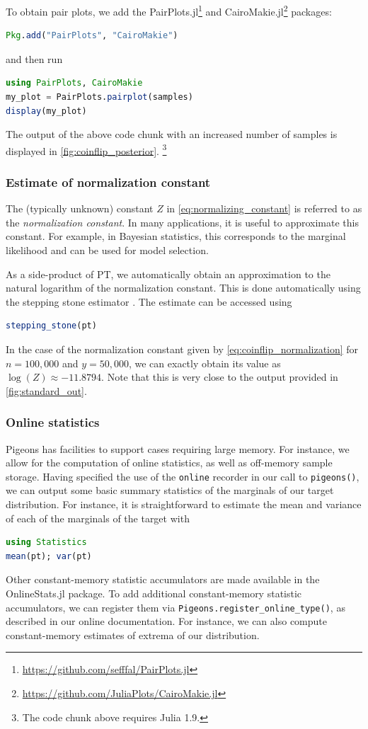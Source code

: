  
To obtain pair plots, we add the 
PairPlots.jl\footnote{\url{https://github.com/sefffal/PairPlots.jl}}
and CairoMakie.jl\footnote{\url{https://github.com/JuliaPlots/CairoMakie.jl}}
packages:
\begin{lstlisting}[language=Julia]
Pkg.add("PairPlots", "CairoMakie")
\end{lstlisting}
and then run
\begin{lstlisting}[language=Julia]
using PairPlots, CairoMakie
my_plot = PairPlots.pairplot(samples) 
display(my_plot)
\end{lstlisting}
The output of the above code chunk with an increased number of samples 
is displayed in \cref{fig:coinflip_posterior}.
\footnote{The code chunk above requires Julia 1.9.}


\subsubsection{Estimate of normalization constant}
The (typically unknown) constant $Z$ in \cref{eq:normalizing_constant} is 
referred to as the \emph{normalization constant}. 
In many applications, it is useful to approximate this constant. 
For example, in Bayesian statistics, this corresponds to the 
marginal likelihood and can be used for model selection. 

 
As a side-product of PT, we automatically obtain an approximation to the natural 
logarithm of the normalization constant. This is done automatically using the 
stepping stone estimator \cite{xie2011improving}.
The estimate can be accessed using
\begin{lstlisting}[language=Julia]
stepping_stone(pt)
\end{lstlisting}
In the case of the normalization constant given by \cref{eq:coinflip_normalization} 
for $n=100,000$ and $y=50,000$, we can exactly obtain its value as $\log(Z) \approx -11.8794$.
Note that this is very close to the output provided in \cref{fig:standard_out}.


\subsubsection{Online statistics}
\label{sec:online_stats}
Pigeons has facilities to support cases requiring large memory. For instance, we
allow for the computation of online statistics, as well as off-memory sample storage.
Having specified the use of the \texttt{online} recorder in our call to \texttt{pigeons()}, 
we can output some basic summary statistics of the marginals of our target distribution. 
For instance, it is straightforward to estimate the mean and variance of each 
of the marginals of the target with 
\begin{lstlisting}[language=Julia]
using Statistics
mean(pt); var(pt)
\end{lstlisting}
Other constant-memory statistic accumulators are made available in the 
OnlineStats.jl \cite{day2020onlinestats} package. 
To add additional constant-memory statistic accumulators, we 
can register them via \texttt{Pigeons.register\_online\_type()}, as described in our 
online documentation. For instance, we can also compute constant-memory estimates 
of extrema of our distribution.


